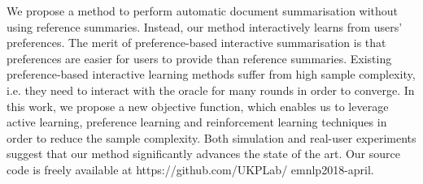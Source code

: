 We propose a method to perform automatic document summarisation without using reference summaries. Instead, our method interactively learns from users' preferences. The merit of preference-based interactive summarisation is that preferences are easier for users to provide than reference summaries. Existing preference-based interactive learning methods suffer from high sample complexity, i.e. they need to interact with the oracle for many rounds in order to converge. In this work, we propose a new objective function, which enables us to leverage active learning, preference learning and reinforcement learning techniques in order to reduce the sample complexity. Both simulation and real-user experiments suggest that our method significantly advances the state of the art. Our source code is freely available at https://github.com/UKPLab/ emnlp2018-april.
